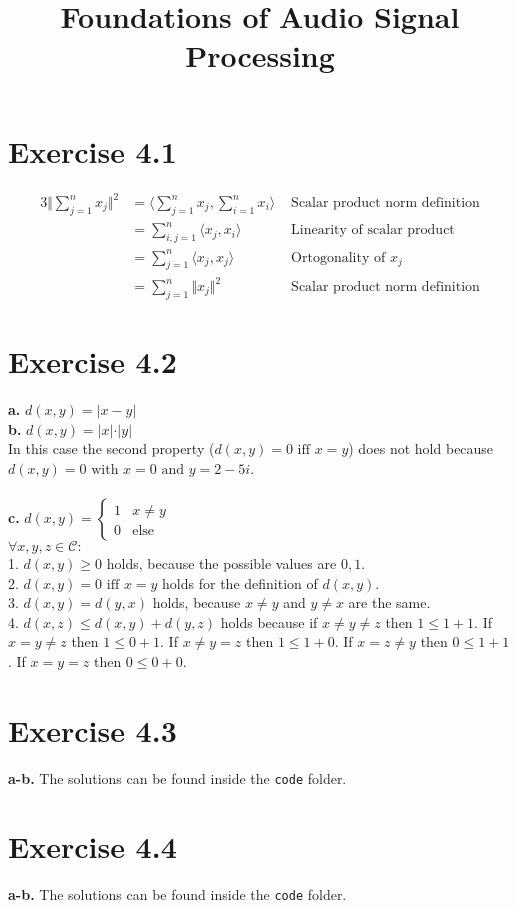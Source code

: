 \documentclass[12pt]{article}
\title{Foundations of Audio Signal Processing\\ \ass}
\author{\auth}
\begin{document}
	\maketitle
	\section*{Exercise 4.1}
	\begin{alignat*}{3}
	\Vert \sum_{j=1}^{n} x_j\Vert^2 &= \langle\sum_{j=1}^{n} x_j, \sum_{i=1}^{n} x_i\rangle & \text{ Scalar product norm definition}\\
	&=\sum_{i, j=1}^{n} \langle x_j, x_i\rangle & \text{ Linearity of scalar product}\\
	&=\sum_{j=1}^{n} \langle x_j, x_j\rangle & \text{ Ortogonality of $x_j$}\\
	&=\sum_{j=1}^{n} \Vert x_j \Vert^2 & \text{ Scalar product norm definition}
	\end{alignat*}
	\section*{Exercise 4.2}
	\textbf{a.} $d(x,y) = \vert x - y \vert$\\
	\textbf{b.} $d(x,y) = \vert x \vert \cdot \vert y \vert$\\
	In this case the second property ($d(x, y) = 0 \text{ iff } x = y$) does not hold because $d(x,y) = 0 \text{ with } x = 0 \text{ and } y = 2 - 5i$.\\\\
	\textbf{c.} $d(x,y) = \begin{cases} 1 & x \neq y\\ 0 & \mbox{else} \end{cases}$\\
	$\forall x, y, z \in \mathcal{C}:$\\
	1. $d(x,y) \geq 0$ holds, because the possible values are $0,1$.\\
	2. $d(x, y) = 0 \text{ iff } x = y$ holds for the definition of $d(x,y)$.\\
	3. $d(x, y) = d(y,x)$ holds, because $x \neq y$ and $y \neq x$ are the same.\\
	4. $d(x, z) \leq d(x, y) + d(y, z)$ holds because if $ x \neq y \neq z$ then $1 \leq 1 + 1$. If $x = y \neq z$ then $1 \leq 0 + 1$. If $x \neq y = z$ then $1 \leq 1 + 0$. If $x = z \neq y$ then $0 \leq 1 + 1$. If $x = y = z$ then $0 \leq 0 + 0$.
	
	\section*{Exercise 4.3}
	\textbf{a-b.} The solutions can be found inside the \texttt{code} folder.
	\section*{Exercise 4.4}
	\textbf{a-b.} The solutions can be found inside the \texttt{code} folder.
\end{document}
